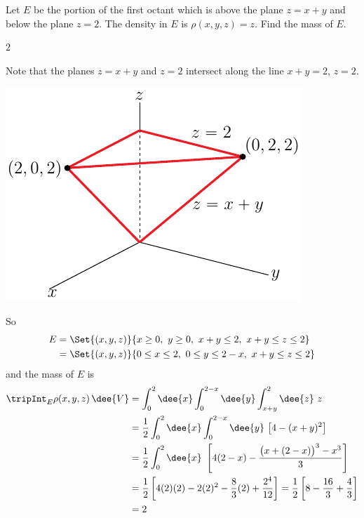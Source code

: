 \begin{question}[M200 2011A] %
Let $E$ be the portion of the first octant which is above the plane $z = x + y$ 
and below the plane $z = 2$. The density in $E$ is $\rho(x, y, z) = z$. Find the mass of $E$.
\end{question}

%

\begin{answer}
$2$
\end{answer}

\begin{solution}
Note that the planes $z = x + y$ and $z = 2$ intersect along the line
$x+y=2$, $z=2$. 

\begin{center}
     \includegraphics[scale=1.0]{fig/OE11A_7.pdf}
\end{center}

So
\begin{align*}
E &=\Set{(x,y,z)}{x\ge 0,\ y\ge 0,\ x+y\le 2,\ x+y\le z\le 2} \\
  &= \Set{(x,y,z)}{0\le x\le 2,\ 0\le y\le 2-x,\ x+y\le z\le 2} 
\end{align*}
and the mass of $E$ is
\begin{align*}
\tripInt_E \rho(x,y,z)\,\dee{V}
&=\int_0^2\dee{x} \int_0^{2-x}\dee{y} \int_{x+y}^2\dee{z}\ z \\
&=\frac{1}{2}\int_0^2\dee{x} \int_0^{2-x}\dee{y} \ \big[4-(x+y)^2\big] \\
&=\frac{1}{2}\int_0^2\dee{x}\ 
              \left[4(2-x)-\frac{\big(x+(2-x)\big)^3-x^3}{3}\right] \\
&=\frac{1}{2}  \left[4(2)(2)-2(2)^2 -\frac{8}{3}(2)+\frac{2^4}{12}
              \right]
=\frac{1}{2}  \left[8 -\frac{16}{3}+\frac{4}{3}
              \right] \\
&=2
\end{align*}
\end{solution}

